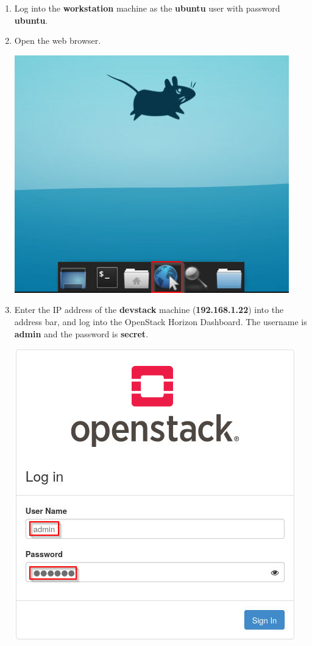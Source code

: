 \documentclass[letterpaper, 12pt]{article}
\begin{document}
\begin{enumerate}
    \item Log into the \textbf{workstation} machine as the \textbf{ubuntu} user with password \textbf{ubuntu}.

    \item Open the web browser.

    \begin{center}
    \includegraphics[scale=0.75]{images/part1/step2.png}
    \end{center}

    \item Enter the IP address of the \textbf{devstack} machine (\textbf{192.168.1.22}) into the address bar, and log
    into the OpenStack Horizon Dashboard. The username is \textbf{admin} and the password is \textbf{secret}.
    
    \begin{center}
        \includegraphics[scale=0.75]{images/part1/step3.png}
    \end{center}


\end{enumerate}
\end{document}
